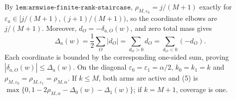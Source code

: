 By \(\texttt{lem:armwise-finite-rank-staircase}\), \(\rho_{M,\varepsilon_a}=j/(M+1)\) exactly for \(\varepsilon_a\in[j/(M+1),(j+1)/(M+1))\), so the coordinate elbows are \(j/(M+1)\). Moreover, \(d_O=-\delta_{a,O}(w)\), and zero total mass gives
\[
\Delta_a(w)=\frac12\sum_O|d_O|=\sum_{d_O>0}d_O=\sum_{d_O<0}(-d_O).
\]
Each coordinate is bounded by the corresponding one-sided sum, proving \(|\delta_{a,O}(w)|\le\Delta_a(w)\). On the diagonal \(\varepsilon_0=\varepsilon_1=\alpha/2\), \(k_0=k_1=k\) and \(\rho_{M,\varepsilon_0}=\rho_{M,\varepsilon_1}=\rho_{M,\alpha}\). If \(k\le M\), both arms are active and (5) is \(\max\{0,1-2\rho_{M,\alpha}-\Delta_0(w)-\Delta_1(w)\}\); if \(k=M+1\), coverage is one.